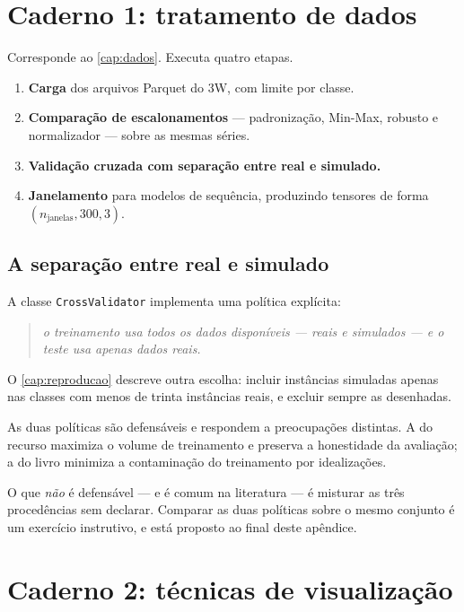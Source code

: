 \section{Caderno 1: tratamento de dados}

Corresponde ao \cref{cap:dados}. Executa quatro etapas.

\begin{enumerate}[leftmargin=*,itemsep=0.3em]
  \item \textbf{Carga} dos arquivos Parquet do 3W, com limite por classe.
  \item \textbf{Comparação de escalonamentos} --- padronização, Min-Max, robusto e
        normalizador --- sobre as mesmas séries.
  \item \textbf{Validação cruzada com separação entre real e simulado.}
  \item \textbf{Janelamento} para modelos de sequência, produzindo tensores de forma
        $(n_{\text{janelas}}, 300, 3)$.
\end{enumerate}

\subsection{A separação entre real e simulado}

A classe \texttt{CrossValidator} implementa uma política explícita:

\begin{quote}
\emph{o treinamento usa todos os dados disponíveis --- reais e simulados --- e o teste usa
apenas dados reais.}
\end{quote}

\begin{destaque}
O \cref{cap:reproducao} descreve outra escolha: incluir instâncias simuladas apenas nas
classes com menos de trinta instâncias reais, e excluir sempre as desenhadas.

As duas políticas são defensáveis e respondem a preocupações distintas. A do recurso
maximiza o volume de treinamento e preserva a honestidade da avaliação; a do livro
minimiza a contaminação do treinamento por idealizações.

O que \emph{não} é defensável --- e é comum na literatura --- é misturar as três
procedências sem declarar. Comparar as duas políticas sobre o mesmo conjunto é um
exercício instrutivo, e está proposto ao final deste apêndice.
\end{destaque}

\section{Caderno 2: técnicas de visualização}

